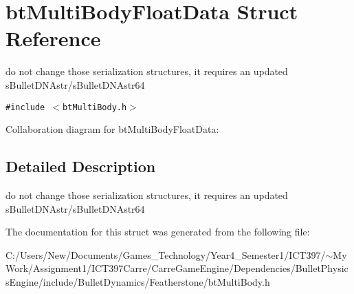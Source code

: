 \hypertarget{structbt_multi_body_float_data}{
\section{btMultiBodyFloatData Struct Reference}
\label{structbt_multi_body_float_data}
}
do not change those serialization structures, it requires an updated sBulletDNAstr/sBulletDNAstr64  


{\tt \#include $<$btMultiBody.h$>$}

Collaboration diagram for btMultiBodyFloatData:

\subsection{Detailed Description}
do not change those serialization structures, it requires an updated sBulletDNAstr/sBulletDNAstr64 

The documentation for this struct was generated from the following file:\begin{CompactItemize}
\item 
C:/Users/New/Documents/Games\_\-Technology/Year4\_\-Semester1/ICT397/$\sim$My Work/Assignment1/ICT397Carre/CarreGameEngine/Dependencies/BulletPhysicsEngine/include/BulletDynamics/Featherstone/btMultiBody.h\end{CompactItemize}

